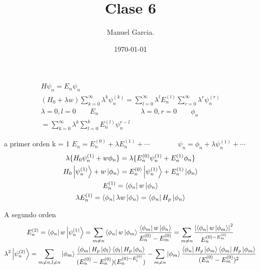 \documentclass{article}
\title{Clase 6 }
\author{Manuel Garcia.}
\date{\today}
\begin{document}
\maketitle

\section{}
\begin{gather*}
  H \psi_n = E_n \psi_n \\  
  (H_0 + \lambda w) \displaystyle\sum_{k = 0 }^{ \infty} \lambda ^ {k } \psi _n ^ {(k)} = \displaystyle\sum_{l = 0 }^{\infty} \lambda^l E_n ^ {(l )} \displaystyle\sum_{r= 0 }^{\infty} \lambda ^ {r } \psi_n ^ {(r) } \\
  \lambda = 0 , l = 0 \qquad E_n \qquad \qquad \qquad \lambda = 0 , r = 0 \qquad \phi_n \\ 
  = \displaystyle\sum_{ k = 0 }^{ \infty} \lambda ^ {k } \displaystyle\sum_{l = 0 }^{ k } E_n ^ {(l) } \psi_n ^ {r- l }
\end{gather*}

\hfill 

\hfill 

\hfill 

\hfill 

a primer orden k = 1 $ E_n = E_n ^ {(0)} + \lambda E_n ^ {(1) } + \cdots \qquad \qquad \psi_n = \phi_n + \lambda \psi_n ^ {(1) } + \cdots$
\begin{gather*}
  \lambda\{H_0 \psi_n ^ {(1) } + w \phi_n \} = \lambda \{E_n ^ {(0 )} \psi_n ^ {(1)} + E_n ^ {(1)} \phi_n \}\\
  H_0 \ket{\psi_n ^ {(1)}} + w \ket{\phi_n } = E_n ^ {(0)}\ket{\psi_n ^ {(1)}} + E_n ^ {(1)} \ket{\phi_n } \\
  E_n ^ {(1)} = \bra{\phi_n } w \ket{ \phi _n }\\
  \lambda E_n ^ {(1) } = \bra{\phi_n }\lambda w \ket{\phi_n } = \bra{\phi_n }H_p \ket{\phi_n }  
\end{gather*}


\hfill 

\hfill 

\hfill 

\hfill 

A segundo orden 
\begin{gather*}
  E_n ^ {(2)} = \bra{\phi_n } w \ket{\psi_n ^ {(1)}} = \displaystyle\sum_{m \neq n }^{}\bra{\phi_n }w \ket{\phi_m } \frac{\bra{\phi_m }w \ket{\phi_n } }{E_n ^ {(0)} - E_m ^ {(0)}} = \displaystyle\sum_{m \neq n }^{} \frac{\left|\bra{\phi_n }w \ket{\phi_m } \right|^2 }{E_n ^ {(0)- E_m ^ {(0)}}}   \\
  \lambda^2 \ket{\psi_n ^ {(2)}} = \displaystyle\sum_{m\neq n , l \neq n }^{} \ket{\phi_m } \frac{\bra{\phi_m } H_p \ket{\phi_l } \bra{\phi_l }H_p \ket{\phi_n }  }{(E_n ^ {(0)} - E_n ^ {(0)})(E_n ^ {(0) - E_l ^ {(0)}})} - \displaystyle\sum_{m \neq n }^{} \ket{\phi_m } \frac{\bra{\phi_n }H_p \ket{\phi_m }\bra{\phi_m }H_p \ket{\phi_m }  }{(E_n ^ {(0 )} - E_m ^ {(0)})^2}
\end{gather*}
\end{document}
